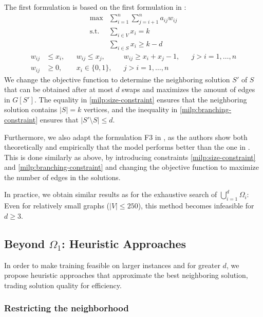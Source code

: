 \documentclass[draft,final]{vutinfth} %
\begin{document}
The first formulation is based on the first formulation in \cite{pattillo_maximum_2013}:  
\begin{align}
    \max & \sum_{i=1}^n \sum_{j=i+1}^n a_{ij} w_{ij} \\
    \text{s.t. } & \sum_{i \in V} x_i = k \label{milp:size-constraint} \\ 
     & \sum_{i \in S} x_i \geq k - d    \label{milp:branching-constraint}
\end{align}
\begin{align}
    w_{ij} &\leq x_i, & & w_{ij} \leq x_j, & & w_{ij} \geq x_i + x_j - 1, & & j > i=1, \dots , n \\
    w_{ij} &\geq 0,   & & x_i \in \{0,1\}, & & j > i = 1, \dots, n        & & 
\end{align}
We change the objective function to determine the neighboring solution $S'$ of $S$ that can be obtained after at most $d$ swaps and maximizes the amount of edges in $G[S']$. The equality in \ref{milp:size-constraint} ensures that the neighboring solution contains $|S| = k$ vertices, and the inequality in \ref{milp:branching-constraint} ensures that $|S' \setminus S| \leq d$. 

Furthermore, we also adapt the formulation F3 in \cite{VeremyevPBP16}, as the authors show both theoretically and empirically that the model performs better than the one in \cite{pattillo_maximum_2013}. This is done similarly as above, by introducing constraints \ref{milp:size-constraint} and \ref{milp:branching-constraint} and changing the objective function to maximize the number of edges in the solutions.  

In practice, we obtain similar results as for the exhaustive search of $\bigcup_{i=1}^d \Omega_i$: Even for relatively small graphs ($|V| \leq 250$), this method becomes infeasible for $d \geq 3$. 

\subsection{Beyond $\Omega_1$: Heuristic Approaches}

In order to make training feasible on larger instances and for greater $d$, we propose heuristic approaches that approximate the best neighboring solution, trading solution quality for efficiency. 

\subsubsection{Restricting the neighborhood}
\end{document}
